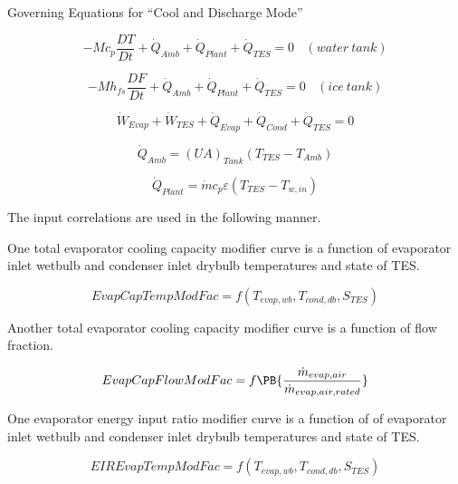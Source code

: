Governing Equations for ``Cool and Discharge Mode''

\begin{equation}
-M{c_p}\frac{{DT}}{{Dt}} + {\dot Q_{Amb}} + {\dot Q_{Plant}} + {\dot Q_{TES}} = 0 ~~~~ (water~tank)
\end{equation}

\begin{equation}
-M{h_{fs}}\frac{{DF}}{{Dt}} + {\dot Q_{Amb}} + {\dot Q_{Plant}} + {\dot Q_{TES}} = 0 ~~~~ (ice~tank)
\end{equation}

\begin{equation}
{\dot W_{Evap}} + {\dot W_{TES}} + {\dot Q_{Evap}} + {\dot Q_{Cond}} + {\dot Q_{TES}} = 0
\end{equation}

\begin{equation}
{\dot Q_{Amb}} = {\left( {UA} \right)_{Tank}}\left( {{T_{TES}} - {T_{Amb}}} \right)
\end{equation}

\begin{equation}
  {\dot Q_{Plant}} = \dot m{c_p}\varepsilon \left( {{T_{TES}} - {T_{w,in}}} \right)
\end{equation}

The input correlations are used in the following manner.

One total evaporator cooling capacity modifier curve is a function of evaporator inlet wetbulb and condenser inlet drybulb temperatures and state of TES.

\begin{equation}
EvapCapTempModFac = f\left( {{T_{evap,wb}},{T_{cond,db}},{S_{TES}}} \right)
\end{equation}

Another total evaporator cooling capacity modifier curve is a function of flow fraction.

\begin{equation}
EvapCapFlowModFac = f\PB{\frac{\dot{m}_{evap,air}}{\dot{m}_{evap,air,rated}}}
\end{equation}

One evaporator energy input ratio modifier curve is a function of of evaporator inlet wetbulb and condenser inlet drybulb temperatures and state of TES.

\begin{equation}
EIREvapTempModFac = f\left( {{T_{evap,wb}},{T_{cond,db}},{S_{TES}}} \right)
\end{equation}

